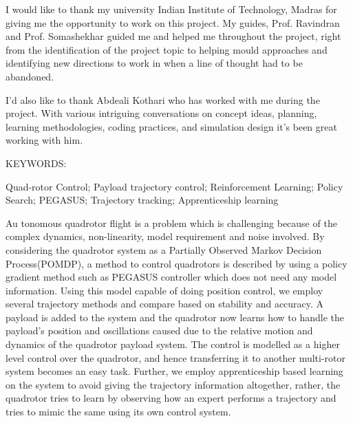 \documentclass[hidelinks,BTech]{iitmdiss}
\begin{document}
\acknowledgements

I would like to thank my university Indian Institute of Technology, Madras for giving me the opportunity to work on this project. My guides, Prof. Ravindran and Prof. Somashekhar guided me and helped me throughout the project, right from the identification of the project topic to helping mould approaches and identifying new directions to work in when a line of thought had to be abandoned.

I'd also like to thank Abdeali Kothari who has worked with me during the project. With various intriguing conversations on concept ideas, planning, learning methodologies, coding practices, and simulation design it's been great working with him. 


\abstract

\noindent KEYWORDS: \hspace*{0.5em} \parbox[t]{4.4in}{Quad-rotor Control; Payload  trajectory control; Reinforcement Learning; Policy Search; PEGASUS; Trajectory tracking; Apprenticeship learning }

\vspace*{24pt}

\noindent Au tonomous quadrotor flight is a problem which is challenging because of the complex dynamics, non-linearity, model requirement and noise involved. By considering the quadrotor system as a Partially Observed Markov Decision Process(POMDP), a method to control quadrotors is described by using a policy gradient method such as PEGASUS controller which does not need any model information. Using this model capable of doing position control, we employ several trajectory methods and compare based on stability and accuracy. A payload is added to the system and the quadrotor now learns how to handle the payload's position and oscillations caused due to the relative motion and dynamics of the quadrotor payload system. The control is modelled as a higher level control over the quadrotor, and hence transferring it to another multi-rotor system becomes an easy task. Further, we employ apprenticeship based learning on the system to avoid giving the trajectory information altogether, rather, the quadrotor tries to learn by observing how an expert performs a trajectory and tries to mimic the same using its own control system.

\pagebreak
\end{document}
